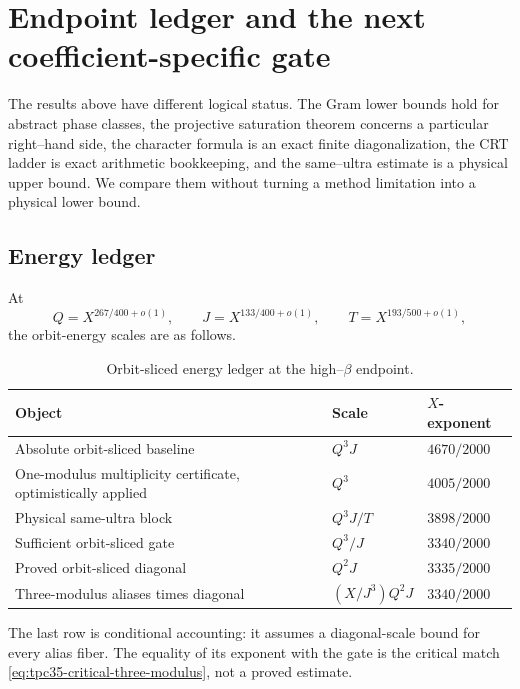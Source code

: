 \section{Endpoint ledger and the next coefficient-specific gate}
\label{sec:tpc35-ledger-next-gate}

The results above have different logical status.  The Gram lower bounds
hold for abstract phase classes, the projective saturation theorem concerns
a particular right--hand side, the character formula is an exact finite
diagonalization, the CRT ladder is exact arithmetic bookkeeping, and the
same--ultra estimate is a physical upper bound.  We compare them without
turning a method limitation into a physical lower bound.

\subsection{Energy ledger}

At
\[
 Q=X^{267/400+o(1)},\qquad
 J=X^{133/400+o(1)},\qquad
 T=X^{193/500+o(1)},
\]
the orbit-energy scales are as follows.

\begin{table}[H]
\centering
\caption{Orbit-sliced energy ledger at the high--\(\beta\) endpoint.}
\label{tab:tpc35-energy-ledger}
\small
\begin{tabular}{@{}>{\raggedright\arraybackslash}p{}
>{\raggedright\arraybackslash}p{}
>{\raggedleft\arraybackslash}p{}@{}}
\toprule
Object & Scale & \(X\)-exponent \\
\midrule
Absolute orbit-sliced baseline & \(Q^3J\) & \(4670/2000\) \\
One-modulus multiplicity certificate, optimistically applied
 & \(Q^3\) & \(4005/2000\) \\
Physical same-ultra block & \(Q^3J/T\) & \(3898/2000\) \\
Sufficient orbit-sliced gate & \(Q^3/J\) & \(3340/2000\) \\
Proved orbit-sliced diagonal & \(Q^2J\) & \(3335/2000\) \\
Three-modulus aliases times diagonal & \((X/J^3)Q^2J\) & \(3340/2000\) \\
\bottomrule
\end{tabular}
\end{table}

The last row is conditional accounting: it assumes a diagonal-scale bound
for every alias fiber.  The equality of its exponent with the gate is the
critical match \eqref{eq:tpc35-critical-three-modulus}, not a proved
estimate.

